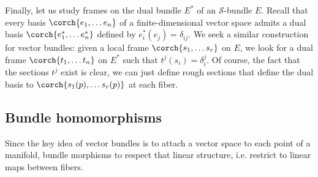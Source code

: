 Finally, let us study frames on the dual bundle \(E^*\) of an \(\mathcal{S}\)-bundle \(E\). Recall that every basis \(\corch{e_1, \ldots e_n}\) of a finite-dimensional vector space admits a dual basis \(\corch{e_1^*, \ldots e_n^*}\) defined by \(e_i^*(e_j)=\delta_{ij}\). We seek a similar construction for vector bundles: given a local frame \(\corch{s_1, \ldots s_r}\) on \(E\), we look for a dual frame \(\corch{t_1, \ldots t_n}\) on \(E^*\) such that \(t^j(s_i)=\delta^j_i\). Of course, the fact that the sections \(t^j\) exist is clear, we can just define rough sections that define the dual basis to \(\corch{s_1(p), \ldots s_r(p)}\) at each fiber. %


\subsection{Bundle homomorphisms}
Since the key idea of vector bundles is to attach a vector space to each point of a manifold, bundle morphisms to respect that linear structure, i.e. restrict to linear maps between fibers.

